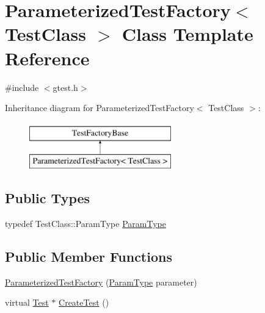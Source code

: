 \hypertarget{classtesting_1_1internal_1_1ParameterizedTestFactory}{\section{\-Parameterized\-Test\-Factory$<$ \-Test\-Class $>$ \-Class \-Template \-Reference}
\label{da/d84/classtesting_1_1internal_1_1ParameterizedTestFactory}
}


{\ttfamily \#include $<$gtest.\-h$>$}

\-Inheritance diagram for \-Parameterized\-Test\-Factory$<$ \-Test\-Class $>$\-:\begin{figure}[H]
\begin{center}
\leavevmode
\includegraphics[height=2.000000cm]{da/d84/classtesting_1_1internal_1_1ParameterizedTestFactory}
\end{center}
\end{figure}
\subsection*{\-Public \-Types}
\begin{DoxyCompactItemize}
\item 
typedef \-Test\-Class\-::\-Param\-Type \hyperlink{classtesting_1_1internal_1_1ParameterizedTestFactory_a221aa0ab26352e74f11bdf2f9e058f09}{\-Param\-Type}
\end{DoxyCompactItemize}
\subsection*{\-Public \-Member \-Functions}
\begin{DoxyCompactItemize}
\item 
\hyperlink{classtesting_1_1internal_1_1ParameterizedTestFactory_aa1e2607144d1655931471ae0897f1768}{\-Parameterized\-Test\-Factory} (\hyperlink{classtesting_1_1internal_1_1ParameterizedTestFactory_a221aa0ab26352e74f11bdf2f9e058f09}{\-Param\-Type} parameter)
\item 
virtual \hyperlink{classtesting_1_1Test}{\-Test} $\ast$ \hyperlink{classtesting_1_1internal_1_1ParameterizedTestFactory_a0c8d3cb7d986c562f4b2913a2650e3e0}{\-Create\-Test} ()
\end{DoxyCompactItemize}
